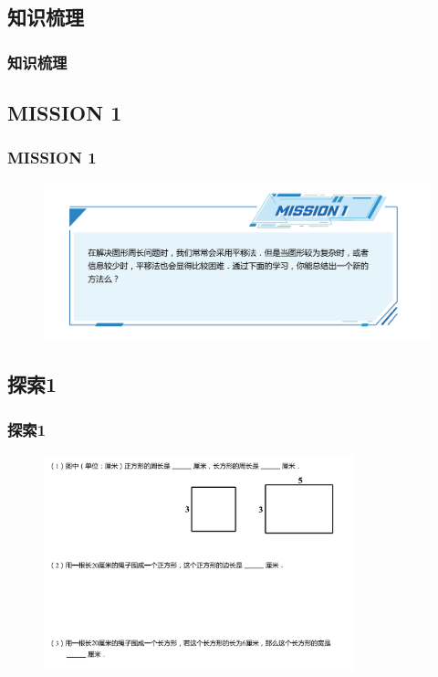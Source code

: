 \subsection{知识梳理}
\begin{frame}
    \frametitle{知识梳理}
\end{frame}

\subsection{MISSION 1}
\begin{frame}
    \frametitle{MISSION 1}
    \begin{figure}[H] 
        \centering
        \includegraphics[width=1\textwidth]{./pics/Chapter_1/mission1.png}
    \end{figure}
\end{frame}

\subsection{探索1}
\begin{frame}
    \frametitle{探索1}
    \begin{figure}[H] 
        \centering
        \includegraphics[width=0.8\textwidth]{./pics/Chapter_1/tansuo1.png}
    \end{figure}
\end{frame}

